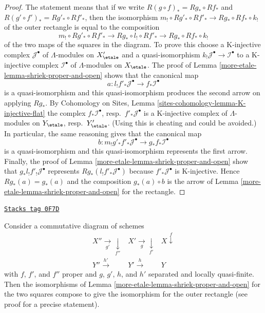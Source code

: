 \begin{proof}
The statement means that if we write
$R(g \circ f)_* = Rg_* \circ Rf_*$ and
$R(g' \circ f')_* = Rg'_* \circ Rf'_*$,
then the isomorphism
$m_! \circ Rg'_* \circ Rf'_* \to Rg_* \circ Rf_* \circ k_!$
of the outer rectangle is equal to the composition
$$
m_! \circ Rg'_* \circ Rf'_* \to
Rg_* \circ l_! \circ Rf'_* \to
Rg_* \circ Rf_* \circ k_!
$$
of the two maps of the squares in the diagram. To prove this choose
a K-injective complex $\mathcal{J}^\bullet$ of $\Lambda$-modules
on $X'_\etale$ and a quasi-isomorphism
$k_!\mathcal{J}^\bullet \to \mathcal{I}^\bullet$
to a K-injective complex $\mathcal{I}^\bullet$ of $\Lambda$-modules
on $X_\etale$. The proof of Lemma \ref{more-etale-lemma-shriek-proper-and-open}
shows that the canonical map
$$
a : l_!f'_*\mathcal{J}^\bullet \to f_*\mathcal{I}^\bullet
$$
is a quasi-isomorphism and this quasi-isomorphism produces the
second arrow on applying $Rg_*$. By
Cohomology on Sites, Lemma \ref{sites-cohomology-lemma-K-injective-flat}
the complex $f_*\mathcal{I}^\bullet$, resp.\ $f'_*\mathcal{J}^\bullet$
is a K-injective complex of $\Lambda$-modules on
$Y_\etale$, resp.\ $Y'_\etale$.
(Using this is cheating and could be avoided.)
In particular, the same reasoning gives that the canonical map
$$
b : m_!g'_*f'_*\mathcal{J}^\bullet \to g_*f_*\mathcal{I}^\bullet
$$
is a quasi-isomorphism and this quasi-isomorphism represents
the first arrow. Finally, the proof of Lemma \ref{more-etale-lemma-shriek-proper-and-open}
show that $g_*l_!f'_!\mathcal{J}^\bullet$ represents
$Rg_*(l_!f'_*\mathcal{J}^\bullet)$ because $f'_*\mathcal{J}^\bullet$
is K-injective. Hence $Rg_*(a) = g_*(a)$ and the composition
$g_*(a) \circ b$ is the arrow of Lemma \ref{more-etale-lemma-shriek-proper-and-open}
for the rectangle.
\end{proof}

\begin{lemma}
\label{more-etale-lemma-shriek-proper-and-open-compose-horizontal}
\href{https://stacks.math.columbia.edu/tag/0F7D}{\texttt{Stacks tag 0F7D}}

Consider a commutative diagram of schemes
$$
\begin{array}{ccc}X'' \underset{g'}{\longrightarrow}\underset{f''}{\downarrow} & X' \underset{g}{\longrightarrow}\underset{f'}{\downarrow} & X \overset{f}{\downarrow} \\ Y'' \overset{h'}{\longrightarrow} & Y' \overset{h}{\longrightarrow} & Y\end{array}
$$
with $f$, $f'$, and $f''$ proper and
$g$, $g'$, $h$, and $h'$ separated and locally quasi-finite.
Then the isomorphisms of Lemma \ref{more-etale-lemma-shriek-proper-and-open}
for the two squares compose to give the isomorphism
for the outer rectangle (see proof for a precise statement).
\end{lemma}

